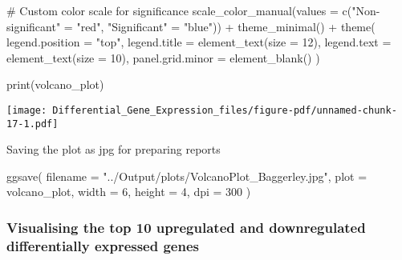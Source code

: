 \documentclass[
  letterpaper,
  DIV=11,
  numbers=noendperiod]{scrartcl}
\newenvironment{Shaded}{\begin{snugshade}}{\end{snugshade}}
\newcommand{\AttributeTok}[1]{\textcolor[rgb]{0.40,0.45,0.13}{#1}}
\newcommand{\CommentTok}[1]{\textcolor[rgb]{0.37,0.37,0.37}{#1}}
\newcommand{\DecValTok}[1]{\textcolor[rgb]{0.68,0.00,0.00}{#1}}
\newcommand{\FunctionTok}[1]{\textcolor[rgb]{0.28,0.35,0.67}{#1}}
\newcommand{\NormalTok}[1]{\textcolor[rgb]{0.00,0.23,0.31}{#1}}
\newcommand{\OtherTok}[1]{\textcolor[rgb]{0.00,0.23,0.31}{#1}}
\newcommand{\SpecialCharTok}[1]{\textcolor[rgb]{0.37,0.37,0.37}{#1}}
\newcommand{\StringTok}[1]{\textcolor[rgb]{0.13,0.47,0.30}{#1}}
\begin{document}
\begin{Shaded}
\begin{Highlighting}[]
  \CommentTok{\# Custom color scale for significance}
  \FunctionTok{scale\_color\_manual}\NormalTok{(}\AttributeTok{values =} \FunctionTok{c}\NormalTok{(}\StringTok{"Non{-}significant"} \OtherTok{=} \StringTok{"red"}\NormalTok{, }\StringTok{"Significant"} \OtherTok{=} \StringTok{"blue"}\NormalTok{)) }\SpecialCharTok{+}
  \FunctionTok{theme\_minimal}\NormalTok{() }\SpecialCharTok{+}
  \FunctionTok{theme}\NormalTok{(}
    \AttributeTok{legend.position =} \StringTok{"top"}\NormalTok{, }
    \AttributeTok{legend.title =} \FunctionTok{element\_text}\NormalTok{(}\AttributeTok{size =} \DecValTok{12}\NormalTok{),  }
    \AttributeTok{legend.text =} \FunctionTok{element\_text}\NormalTok{(}\AttributeTok{size =} \DecValTok{10}\NormalTok{),    }
    \AttributeTok{panel.grid.minor =} \FunctionTok{element\_blank}\NormalTok{()   }
\NormalTok{  )}

\FunctionTok{print}\NormalTok{(volcano\_plot)}
\end{Highlighting}
\end{Shaded}

\texttt{[image: Differential\_Gene\_Expression\_files/figure-pdf/unnamed-chunk-17-1.pdf]}

Saving the plot as jpg for preparing reports

\begin{Shaded}
\begin{Highlighting}[]
\FunctionTok{ggsave}\NormalTok{(}
  \AttributeTok{filename =} \StringTok{"../Output/plots/VolcanoPlot\_Baggerley.jpg"}\NormalTok{,   }
  \AttributeTok{plot =}\NormalTok{ volcano\_plot,                      }
  \AttributeTok{width =} \DecValTok{6}\NormalTok{, }\AttributeTok{height =} \DecValTok{4}\NormalTok{,               }
  \AttributeTok{dpi =} \DecValTok{300}                            
\NormalTok{)}
\end{Highlighting}
\end{Shaded}

\subsubsection{Visualising the top 10 upregulated and downregulated
differentially expressed
genes}\label{visualising-the-top-10-upregulated-and-downregulated-differentially-expressed-genes}
\end{document}
